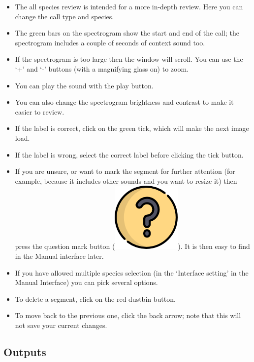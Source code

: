 \documentclass{article}
\begin{document}
\begin{itemize}
\item The all species review is intended for a more in-depth review. Here you can change the call type and species.
\item The green bars on the spectrogram show the start and end of the call; the spectrogram includes a couple of seconds of context sound too. 
\item If the spectrogram is too large then the window will scroll. You can use the `+' and `-' buttons (with a magnifying glass on) to zoom. 
\item You can play the sound with the play button. 
\item You can also change the spectrogram brightness and contrast to make it easier to review. 
\item If the label is correct, click on the green tick, which will make the next image load. 
\item If the label is wrong, select the correct label before clicking the tick button. 
\item If you are unsure, or want to mark the segment for further attention (for example, because it includes other sounds and you want to resize it) then press the question mark button (\includegraphics[scale=0.03]{Figures/questionL}). It is then easy to find in the Manual interface later.
\item If you have allowed multiple species selection (in the `Interface setting' in the Manual Interface) you can pick several options. 
\item To delete a segment, click on the red dustbin button. 
\item To move back to the previous one, click the back arrow; note that this will not save your current changes. 
\end{itemize}


\subsection{Outputs}
\label{sec:outputs}
\end{document}
